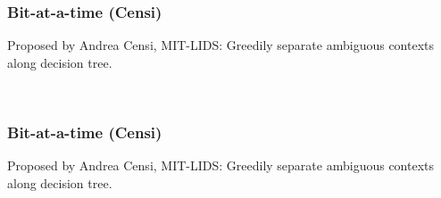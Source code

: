 \documentclass{beamer}
\begin{document}
 \setcounter{subfigure}{0}
 
\begin{frame}
\frametitle{Bit-at-a-time (Censi)}
Proposed by Andrea Censi, MIT-LIDS: Greedily separate ambiguous contexts along decision tree.
\begin{figure}
\centering
{}$\quad\phantom{\to}\quad$
\end{figure}
\end{frame}

\setcounter{subfigure}{0}

\begin{frame}
\frametitle{Bit-at-a-time (Censi)}
Proposed by Andrea Censi, MIT-LIDS: Greedily separate ambiguous contexts along decision tree.
\begin{figure}
\centering
{}$\quad\phantom{\to}\quad$
\end{figure}
\end{frame}
\end{document}
